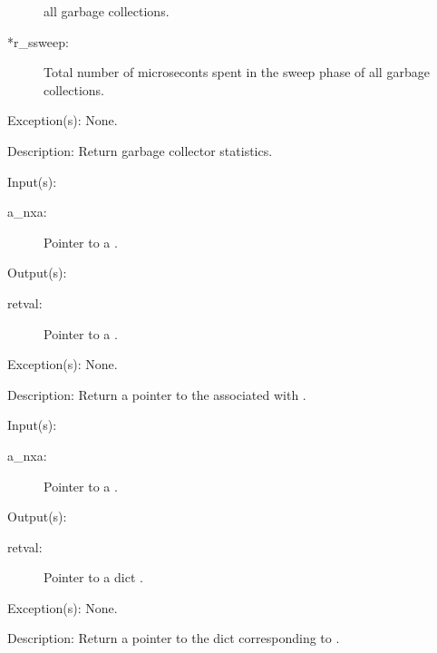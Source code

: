 \begin{capi}
\begin{capilist}
\begin{description}
			all garbage collections.
		\item[*r\_ssweep: ]
			Total number of microseconts spent in the sweep phase of
			all garbage collections.
		\end{description}
	\item[Exception(s): ] None.
	\item[Description: ]
		Return garbage collector statistics.
	\end{capilist}
\label{nxa_nx_get}
	\begin{capilist}
	\item[Input(s): ]
		\begin{description}\item[]
		\item[a\_nxa: ]
			Pointer to a .
		\end{description}
	\item[Output(s): ]
		\begin{description}\item[]
		\item[retval: ]
			Pointer to a .
		\end{description}
	\item[Exception(s): ] None.
	\item[Description: ]
		Return a pointer to the  associated with
		.
	\end{capilist}
\label{nxa_gcdict_get}
	\begin{capilist}
	\item[Input(s): ]
		\begin{description}\item[]
		\item[a\_nxa: ]
			Pointer to a \classname{nxa}.
		\end{description}
	\item[Output(s): ]
		\begin{description}\item[]
		\item[retval: ]
			Pointer to a dict \classname{nxo}.
		\end{description}
	\item[Exception(s): ] None.
	\item[Description: ]
		Return a pointer to the dict  corresponding to
		\onyxop{gcdict}{}.
	\end{capilist}
\end{capi}

